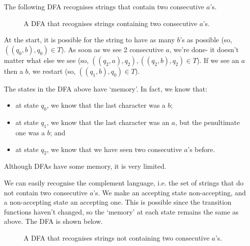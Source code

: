 \documentclass[a4paper, openany]{memoir}
\begin{document}
The following DFA recognises strings that contain two consecutive $a$'s.
\begin{figure}[H]
    \centering
    \caption{A DFA that recognises strings containing two consecutive $a$'s.}
\end{figure}
At the start, it is possible for the string to have as many $b$'s as possible (so, $((q_0, b), q_0) \in T$). As soon as we see 2 consecutive $a$, we're done- it doesn't matter what else we see (so, $((q_2, a), q_2), ((q_2, b), q_2) \in T$). If we see an $a$ then a $b$, we restart (so, $((q_1, b), q_0) \in T$).

The states in the DFA above have `memory'. In fact, we know that:
\begin{itemize}
    \item at state $q_0$, we know that the last character was a $b$;
    \item at state $q_1$, we know that the last character was an $a$, but the penultimate one was a $b$; and
    \item at state $q_2$, we know that we have seen two consecutive $a$'s before.
\end{itemize}
Although DFAs have some memory, it is very limited.

We can easily recognise the complement language, i.e. the set of strings that do not contain two consecutive $a$'s. We make an accepting state non-accepting, and a non-accepting state an accepting one. This is possible since the transition functions haven't changed, so the `memory' at each state remains the same as above. The DFA is shown below.
\begin{figure}[H]
    \centering
    \caption{A DFA that recognises strings not containing two consecutive $a$'s.}
\end{figure}
\end{document}
